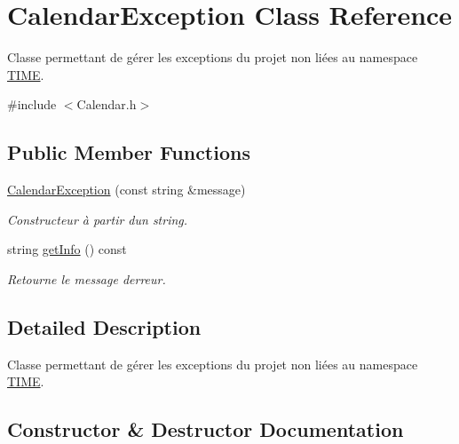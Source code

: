 \hypertarget{class_calendar_exception}{}\section{Calendar\+Exception Class Reference}
\label{class_calendar_exception}


Classe permettant de gérer les exceptions du projet non liées au namespace \hyperlink{namespace_t_i_m_e}{T\+I\+M\+E}.  




{\ttfamily \#include $<$Calendar.\+h$>$}

\subsection*{Public Member Functions}
\begin{DoxyCompactItemize}
\item 
\hyperlink{class_calendar_exception_af4a976332f7659bdd866926f0145a780}{Calendar\+Exception} (const string \&message)
\begin{DoxyCompactList}\small\item\em Constructeur à partir d\textquotesingle{}un string. \end{DoxyCompactList}\item 
string \hyperlink{class_calendar_exception_a381389e24c3efae51565bc4e7865a7d6}{get\+Info} () const 
\begin{DoxyCompactList}\small\item\em Retourne le message d\textquotesingle{}erreur. \end{DoxyCompactList}\end{DoxyCompactItemize}


\subsection{Detailed Description}
Classe permettant de gérer les exceptions du projet non liées au namespace \hyperlink{namespace_t_i_m_e}{T\+I\+M\+E}. 

\subsection{Constructor \& Destructor Documentation}
\hypertarget{class_calendar_exception_af4a976332f7659bdd866926f0145a780}{}
